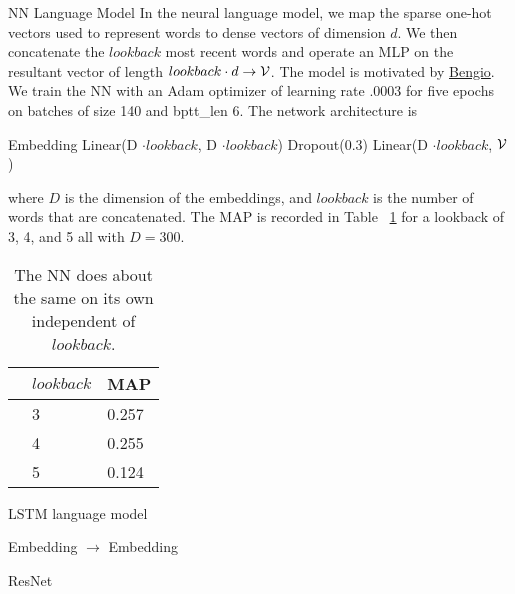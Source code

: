 \documentclass[11pt]{article}
\begin{document}
\begin{subsection}{NN Language Model}
In the neural language model, we map the sparse one-hot vectors used to represent words to dense vectors of dimension $d$. We then concatenate the $lookback$ most recent words and operate an MLP on the resultant vector of length $lookback \cdot d \rightarrow \mathcal{V}$. The model is motivated by \href{http://www.jmlr.org/papers/volume3/bengio03a/bengio03a.pdf}{Bengio}.\\
We train the NN with an Adam optimizer of learning rate .0003 for five epochs on batches of size 140 and bptt\_len 6. The network architecture is\\
\centerline{ Embedding \rightarrow Linear(D $\cdot lookback$, D $\cdot lookback$) \rightarrow Dropout(0.3) \rightarrow Linear(D $\cdot lookback$, $\mathcal{V}$) }
where $D$ is the dimension of the embeddings, and $lookback$ is the number of words that are concatenated. The MAP is recorded in Table ~\ref{tab:NN} for a lookback of 3, 4, and 5 all with $D=300$.

\begin{table}
  \begin{center}
    \begin{tabular}{@{}lll@{}}
      \toprule
      & $lookback$ & MAP\\
      \midrule
      & 3 & 0.257 \\
      & 4 & 0.255 \\
      & 5 & 0.124 \\
      \bottomrule
    \end{tabular}
  \end{center}
  \caption{\label{tab:NN} The NN does about the same on its own independent of $lookback$. }
 \end{table}

\end{subsection}

\begin{subsection}{LSTM language model}




\end{subsection}


\begin{subsection}{Embedding $\rightarrow$ Embedding}



\end{subsection}





\begin{subsection}{ResNet}



\end{subsection}
\end{document}
